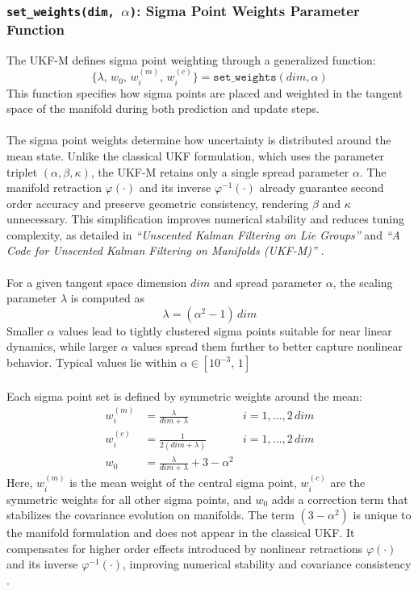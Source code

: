 \subsubsection{\texttt{set\_weights(dim, \texorpdfstring{$\alpha$}{alpha})}: Sigma Point Weights Parameter Function}
The UKF-M defines sigma point weighting through a generalized function:
\begin{equation}
    \{\lambda,\, w_0,\, w_i^{(m)},\, w_i^{(c)}\} = \texttt{set\_weights}(dim, \alpha)
    \label{eq:state-estimation-set-weights}
\end{equation}
This function specifies how sigma points are placed and weighted in the tangent space of the manifold during both prediction and update steps.
\\ \\
The sigma point weights determine how uncertainty is distributed around the mean state. Unlike the classical UKF formulation, which uses the parameter triplet $(\alpha, \beta, \kappa)$, the UKF-M retains only a single spread parameter $\alpha$. The manifold retraction $\varphi(\cdot)$ and its inverse $\varphi^{-1}(\cdot)$ already guarantee second order accuracy and preserve geometric consistency, rendering $\beta$ and $\kappa$ unnecessary. This simplification improves numerical stability and reduces tuning complexity, as detailed in \textit{``Unscented Kalman Filtering on Lie Groups''} \cite{ukf_on_lie_groups} and \textit{``A Code for Unscented Kalman Filtering on Manifolds (UKF-M)''} \cite{ukf_manifold_code}.
\\ \\
For a given tangent space dimension $dim$ and spread parameter $\alpha$, the scaling parameter $\lambda$ is computed as
$$
    \lambda = (\alpha^2 - 1)\,dim
$$
Smaller $\alpha$ values lead to tightly clustered sigma points suitable for near linear dynamics, while larger $\alpha$ values spread them further to better capture nonlinear behavior. Typical values lie within $\alpha \in [10^{-3},\,1]$
\\ \\
Each sigma point set is defined by symmetric weights around the mean:
$$
    \begin{aligned}
    w_i^{(m)} &= \frac{\lambda}{dim+\lambda} \quad &i = 1,\ldots,2 \, dim \\
    w_i^{(c)} &= \frac{1}{2(dim+\lambda)}  \quad &i = 1,\ldots,2 \, dim \\
    w_0 &= \frac{\lambda}{dim+\lambda} + 3 - \alpha^2 
    \end{aligned}
$$
Here, $w_i^{(m)}$ is the mean weight of the central sigma point, $w_i^{(c)}$ are the symmetric weights for all other sigma points, and $w_0$ adds a correction term that stabilizes the covariance evolution on manifolds. The term $(3 - \alpha^2)$ is unique to the manifold formulation and does not appear in the classical UKF. It compensates for higher order effects introduced by nonlinear retractions $\varphi(\cdot)$ and its inverse $\varphi^{-1}(\cdot)$, improving numerical stability and covariance consistency \cite{ukf_manifold_code}.
